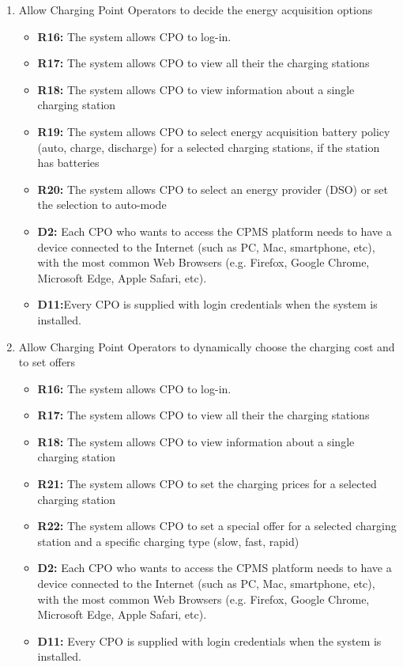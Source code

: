\begin{enumerate}[label=\textbf{-G\arabic*}:]
          \item {Allow Charging Point Operators to decide the energy acquisition options
          \begin{itemize}
              \item \textbf{R16:} The system allows CPO to log-in.
              \item \textbf{R17:} The system allows CPO to view all their the charging stations 
              \item \textbf{R18:} The system allows CPO to view information about a single charging station
              \item \textbf{R19:} The system allows CPO to select energy acquisition battery policy (auto, charge, discharge) for a selected charging stations, if the station has batteries
              \item \textbf{R20:} The system allows CPO to select an energy provider (DSO) or set the selection to auto-mode 
              \item \textbf{D2:} Each CPO who wants to access the CPMS platform needs to have a device connected to the Internet (such as PC, Mac, smartphone, etc), with the most common Web Browsers (e.g. Firefox, Google Chrome, Microsoft Edge, Apple Safari, etc).
              \item \textbf{D11:}Every CPO is supplied with login credentials when the system is installed.              
          \end{itemize}
          }


          \item {Allow Charging Point Operators to dynamically choose the charging cost and to set offers
          \begin{itemize}
            \item \textbf{R16:} The system allows CPO to log-in.
            \item \textbf{R17:} The system allows CPO to view all their the charging stations 
            \item \textbf{R18:} The system allows CPO to view information about a single charging station
            \item \textbf{R21:} The system allows CPO to set the charging prices for a selected charging station
            \item \textbf{R22:} The system allows CPO to set a special offer for a selected charging station and a specific charging type (slow, fast, rapid)
            \item \textbf{D2:} Each CPO who wants to access the CPMS platform needs to have a device connected to the Internet (such as PC, Mac, smartphone, etc), with the most common Web Browsers (e.g. Firefox, Google Chrome, Microsoft Edge, Apple Safari, etc).
            \item \textbf{D11:} Every CPO is supplied with login credentials when the system is installed.              
          \end{itemize}
          }
\end{enumerate}

